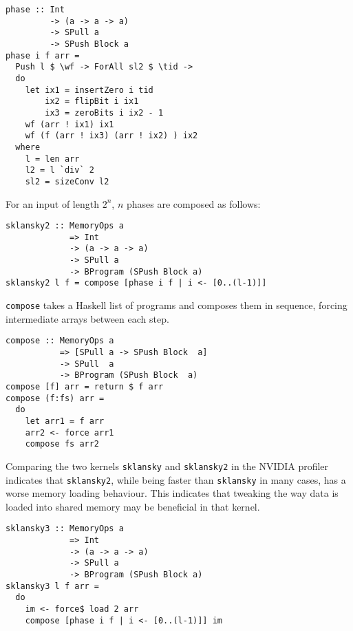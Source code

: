 \begin{small} 
\begin{Verbatim}[samepage=true] 
phase :: Int 
         -> (a -> a -> a) 
         -> SPull a 
         -> SPush Block a
phase i f arr =
  Push l $ \wf -> ForAll sl2 $ \tid ->
  do
    let ix1 = insertZero i tid
        ix2 = flipBit i ix1
        ix3 = zeroBits i ix2 - 1
    wf (arr ! ix1) ix1
    wf (f (arr ! ix3) (arr ! ix2) ) ix2
  where
    l = len arr
    l2 = l `div` 2
    sl2 = sizeConv l2
\end{Verbatim} 
\end{small}

For an input of length $2^n$, $n$ phases
are composed as follows:

\begin{small} 
\begin{Verbatim}[samepage=true] 
sklansky2 :: MemoryOps a 
             => Int
             -> (a -> a -> a)
             -> SPull a
             -> BProgram (SPush Block a)
sklansky2 l f = compose [phase i f | i <- [0..(l-1)]]
\end{Verbatim}
\end{small} 

{\tt compose} takes a Haskell list of programs and composes 
them in sequence, forcing intermediate arrays between each step.

\begin{small} 
\begin{Verbatim}[samepage=true] 
compose :: MemoryOps a
           => [SPull a -> SPush Block  a] 
           -> SPull  a
           -> BProgram (SPush Block  a)
compose [f] arr = return $ f arr
compose (f:fs) arr = 
  do
    let arr1 = f arr
    arr2 <- force arr1
    compose fs arr2
\end{Verbatim} 
\end{small} %

Comparing the two kernels {\tt sklansky} and {\tt sklansky2} in the 
NVIDIA profiler indicates that {\tt sklansky2}, while being faster than 
{\tt sklansky} in many cases, has a worse memory loading behaviour. This 
indicates that tweaking the way data is loaded into shared memory may 
be beneficial in that kernel. 


\begin{small} 
\begin{Verbatim}[samepage=true] 
sklansky3 :: MemoryOps a
             => Int
             -> (a -> a -> a)
             -> SPull a
             -> BProgram (SPush Block a)
sklansky3 l f arr =
  do
    im <- force$ load 2 arr 
    compose [phase i f | i <- [0..(l-1)]] im 
\end{Verbatim}
\end{small}  %


